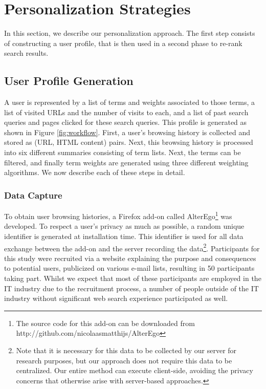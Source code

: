 \documentclass{sig-alternate}
\begin{document}
\section{Personalization Strategies}

In this section, we describe our personalization approach. The first step consists of constructing a user profile, that is then used in a second phase to re-rank search results.

\subsection{User Profile Generation}

A user is represented by a list of terms and weights associated to those terms, a list of visited URLs and the number of visits to each, and a list of past search queries and pages clicked for these search queries. This profile is generated as shown in Figure \ref{fig:workflow}. First, a user's browsing history is collected and stored as (URL, HTML content) pairs. Next, this browsing history is processed into six different summaries consisting of term lists. Next, the terms can be filtered, and finally term weights are generated using three different weighting algorithms. We now describe each of these steps in detail.

\subsubsection{Data Capture}


To obtain user browsing histories, a Firefox add-on called AlterEgo\footnote{The source code for this add-on can be downloaded from  http://github.com/nicolaasmatthijs/AlterEgo} was developed. To respect a user's privacy as much as possible, a random unique identifier is generated at installation time. This identifier is used for all data exchange between the add-on and the server recording the data\footnote{Note that it is necessary for this data to be collected by our server for research purposes, but our approach does not require this data to be centralized. Our entire method can execute client-side, avoiding the privacy concerns that otherwise arise with server-based approaches.}. Participants for this study were recruited via a website explaining the purpose and consequences to potential users, publicized on various e-mail lists, resulting in 50 participants taking part. Whilst we expect that most of these participants are employed in the IT industry due to the recruitment process, a number of people outside of the IT industry without significant web search experience participated as well.
\end{document}
